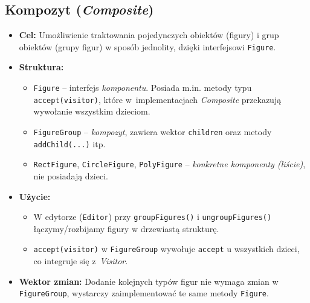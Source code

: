 \documentclass[a4paper,12pt]{article}
\begin{document}
\subsection{Kompozyt (\emph{Composite})}
\begin{itemize}
    \item \textbf{Cel:} Umożliwienie traktowania pojedynczych obiektów
    (figury) i grup obiektów (grupy figur) w sposób jednolity, dzięki interfejsowi
    \texttt{Figure}. 
    \item \textbf{Struktura:} 
    \begin{itemize}
      \item \texttt{Figure} -- interfejs \emph{komponentu}. Posiada m.in. metody typu 
      \texttt{accept(visitor)}, które w~implementacjach \emph{Composite} przekazują
      wywołanie wszystkim dzieciom.
      \item \texttt{FigureGroup} -- \emph{kompozyt}, zawiera wektor \texttt{children}
      oraz metody \texttt{addChild(...)} itp.
      \item \texttt{RectFigure}, \texttt{CircleFigure}, \texttt{PolyFigure} -- 
      \emph{konkretne komponenty (liście)}, nie posiadają dzieci.
    \end{itemize}
    \item \textbf{Użycie:} 
    \begin{itemize}
      \item W edytorze (\texttt{Editor}) przy \texttt{groupFigures()} i \texttt{ungroupFigures()}
      łączymy/rozbijamy figury w drzewiastą strukturę.
      \item \texttt{accept(visitor)} w \texttt{FigureGroup} wywołuje
      \texttt{accept} u wszystkich dzieci, co integruje się z~\emph{Visitor}.
    \end{itemize}
    \item \textbf{Wektor zmian:} Dodanie kolejnych typów figur nie wymaga zmian
    w \texttt{FigureGroup}, wystarczy zaimplementować te same metody \texttt{Figure}.
\end{itemize}
\end{document}
